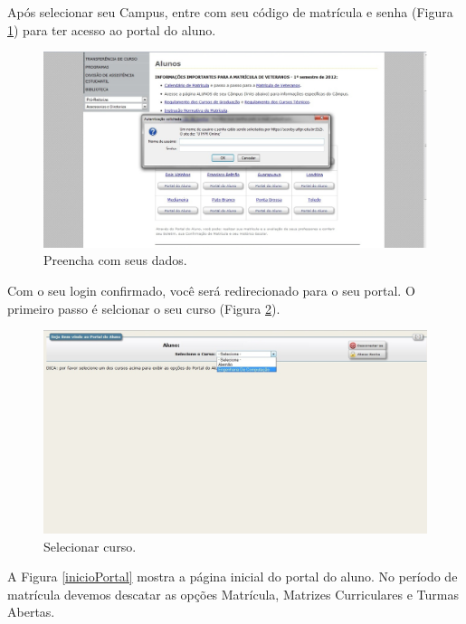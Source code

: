 \documentclass[a4paper,12pt,openany]{article}
\begin{document}
Após selecionar seu Campus, entre com seu código de matrícula e senha (Figura \ref{idMatricula}) para ter acesso ao portal do aluno.

	\begin{figure}[ht!]  \centering
		\includegraphics[scale=0.4]{mat2.jpg}
		\caption{Preencha com seus dados.}
		\label{idMatricula}
	\end{figure}

Com o seu login confirmado, você será redirecionado para o seu portal. O primeiro passo é selcionar o seu curso (Figura \ref{selCurso}).

\newpage
	\begin{figure}[ht!] \centering
		\includegraphics[scale=0.4]{mat3.jpg}
		\caption{Selecionar curso.}
		\label{selCurso}
	\end{figure}

\newpage
A Figura \ref{inicioPortal} mostra a página inicial do portal do aluno. No período de matrícula devemos descatar as opções Matrícula, Matrizes Curriculares e Turmas Abertas. 
\end{document}
